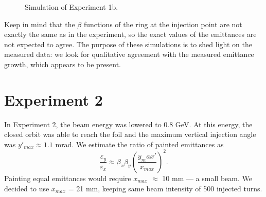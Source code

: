 \begin{figure}[!p]
\begin{subfigure}{0.7\textwidth}
    \end{subfigure}
    \caption{Simulation of Experiment 1b.}
    \label{fig:exp1b_sim}
\end{figure}
%
Keep in mind that the $\beta$ functions of the ring at the injection point are not exactly the same as in the experiment, so the exact values of the emittances are not expected to agree. The purpose of these simulations is to shed light on the measured data: we look for qualitative agreement with the measured emittance growth, which appears to be present.



\section{Experiment 2}

In Experiment 2, the beam energy was lowered to 0.8 GeV. At this energy, the closed orbit was able to reach the foil and the maximum vertical injection angle was $y'_{max} \approx 1.1$ mrad. We estimate the ratio of painted emittances as
%
\begin{equation}\label{eq:painted_emittance_ratio}
    \frac{\varepsilon_y}{\varepsilon_x} \approx 
    \beta_x \beta_y \left(\frac{{y_max'}}{x_{max}}\right)^2 
    .
\end{equation}
%
Painting equal emittances would require $x_{max}$ $\approx$ 10 mm — a small beam. We decided to use $x_{max}$ = 21 mm, keeping same beam intensity of 500 injected turns. 

